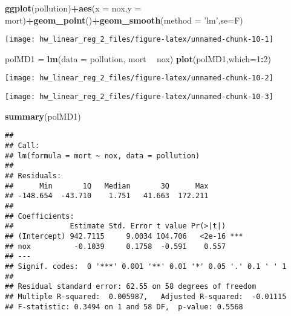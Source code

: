 \documentclass[]{article}
\newenvironment{Shaded}{\begin{snugshade}}{\end{snugshade}}
\newcommand{\DataTypeTok}[1]{\textcolor[rgb]{0.13,0.29,0.53}{#1}}
\newcommand{\DecValTok}[1]{\textcolor[rgb]{0.00,0.00,0.81}{#1}}
\newcommand{\KeywordTok}[1]{\textcolor[rgb]{0.13,0.29,0.53}{\textbf{#1}}}
\newcommand{\NormalTok}[1]{#1}
\newcommand{\OperatorTok}[1]{\textcolor[rgb]{0.81,0.36,0.00}{\textbf{#1}}}
\newcommand{\StringTok}[1]{\textcolor[rgb]{0.31,0.60,0.02}{#1}}
\begin{document}
\begin{Shaded}
\begin{Highlighting}[]
\KeywordTok{ggplot}\NormalTok{(pollution)}\OperatorTok{+}\KeywordTok{aes}\NormalTok{(}\DataTypeTok{x =}\NormalTok{ nox,}\DataTypeTok{y =}\NormalTok{ mort)}\OperatorTok{+}\KeywordTok{geom_point}\NormalTok{()}\OperatorTok{+}\KeywordTok{geom_smooth}\NormalTok{(}\DataTypeTok{method =} \StringTok{'lm'}\NormalTok{,}\DataTypeTok{se=}\NormalTok{F)}
\end{Highlighting}
\end{Shaded}

\begin{center}\texttt{[image: hw\_linear\_reg\_2\_files/figure-latex/unnamed-chunk-10-1]} \end{center}

\begin{Shaded}
\begin{Highlighting}[]
\NormalTok{polMD1 =}\StringTok{ }\KeywordTok{lm}\NormalTok{(}\DataTypeTok{data =}\NormalTok{ pollution, mort }\OperatorTok{~}\StringTok{ }\NormalTok{nox)}
\KeywordTok{plot}\NormalTok{(polMD1,}\DataTypeTok{which=}\DecValTok{1}\OperatorTok{:}\DecValTok{2}\NormalTok{)}
\end{Highlighting}
\end{Shaded}

\begin{center}\texttt{[image: hw\_linear\_reg\_2\_files/figure-latex/unnamed-chunk-10-2]} \end{center}

\begin{center}\texttt{[image: hw\_linear\_reg\_2\_files/figure-latex/unnamed-chunk-10-3]} \end{center}

\begin{Shaded}
\begin{Highlighting}[]
\KeywordTok{summary}\NormalTok{(polMD1)}
\end{Highlighting}
\end{Shaded}

\begin{verbatim}
## 
## Call:
## lm(formula = mort ~ nox, data = pollution)
## 
## Residuals:
##      Min       1Q   Median       3Q      Max 
## -148.654  -43.710    1.751   41.663  172.211 
## 
## Coefficients:
##             Estimate Std. Error t value Pr(>|t|)    
## (Intercept) 942.7115     9.0034 104.706   <2e-16 ***
## nox          -0.1039     0.1758  -0.591    0.557    
## ---
## Signif. codes:  0 '***' 0.001 '**' 0.01 '*' 0.05 '.' 0.1 ' ' 1
## 
## Residual standard error: 62.55 on 58 degrees of freedom
## Multiple R-squared:  0.005987,   Adjusted R-squared:  -0.01115 
## F-statistic: 0.3494 on 1 and 58 DF,  p-value: 0.5568
\end{verbatim}
\end{document}
